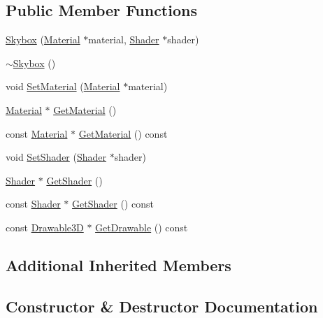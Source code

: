 \subsection*{Public Member Functions}
\begin{DoxyCompactItemize}
\item 
\mbox{\hyperlink{classngl_1_1_skybox_a632c7257a9a92cdf8970a78427f118bf}{Skybox}} (\mbox{\hyperlink{classngl_1_1_material}{Material}} $\ast$material, \mbox{\hyperlink{classngl_1_1_shader}{Shader}} $\ast$shader)
\item 
\mbox{\hyperlink{classngl_1_1_skybox_a14cf215443e9991ce2701f302d484320}{$\sim$\+Skybox}} ()
\item 
void \mbox{\hyperlink{classngl_1_1_skybox_af6f944ce477ea95da191972f645365c9}{Set\+Material}} (\mbox{\hyperlink{classngl_1_1_material}{Material}} $\ast$material)
\item 
\mbox{\hyperlink{classngl_1_1_material}{Material}} $\ast$ \mbox{\hyperlink{classngl_1_1_skybox_a40d8474c6d22e4b72f10ef7cdbac497f}{Get\+Material}} ()
\item 
const \mbox{\hyperlink{classngl_1_1_material}{Material}} $\ast$ \mbox{\hyperlink{classngl_1_1_skybox_a04e9b704258a1527e41c3adfcc0d9f1d}{Get\+Material}} () const
\item 
void \mbox{\hyperlink{classngl_1_1_skybox_a2ef210bc0a50646ac014cd1d1dd1511a}{Set\+Shader}} (\mbox{\hyperlink{classngl_1_1_shader}{Shader}} $\ast$shader)
\item 
\mbox{\hyperlink{classngl_1_1_shader}{Shader}} $\ast$ \mbox{\hyperlink{classngl_1_1_skybox_a3527ff0726586b9eec122f696ebd7c90}{Get\+Shader}} ()
\item 
const \mbox{\hyperlink{classngl_1_1_shader}{Shader}} $\ast$ \mbox{\hyperlink{classngl_1_1_skybox_a796c826a599b8dc3304aed8ecd80e850}{Get\+Shader}} () const
\item 
const \mbox{\hyperlink{classngl_1_1_drawable3_d}{Drawable3D}} $\ast$ \mbox{\hyperlink{classngl_1_1_skybox_a953afc0a4208d5a43e34976551cdbfc0}{Get\+Drawable}} () const
\end{DoxyCompactItemize}
\subsection*{Additional Inherited Members}


\subsection{Constructor \& Destructor Documentation}
\mbox{\label{classngl_1_1_skybox_a632c7257a9a92cdf8970a78427f118bf}} 
